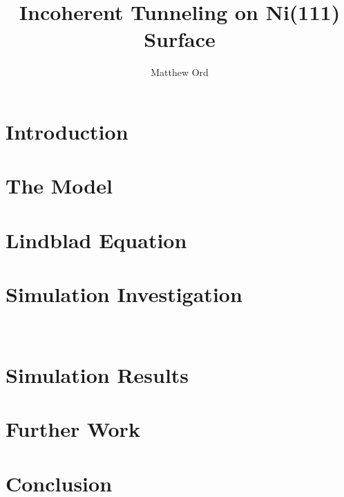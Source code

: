 \documentclass{article}
\title{Incoherent Tunneling on Ni(111) Surface} %
\author{Matthew Ord}
\date{}
\begin{document}
\maketitle

\begin{abstract}
    
\end{abstract}

\pagebreak
\section{Introduction}


\pagebreak

\section{The Model}\label{sec:the model}


\section{Lindblad Equation}\label{sec:redfield}


\section{Simulation Investigation}\label{sec:simulation}


\FloatBarrier\
\section{Simulation Results}\label{sec:simulation results}


\section{Further Work}\label{sec:improvements}


\pagebreak

\section{Conclusion}\label{sec:conclusion}

\end{document}
